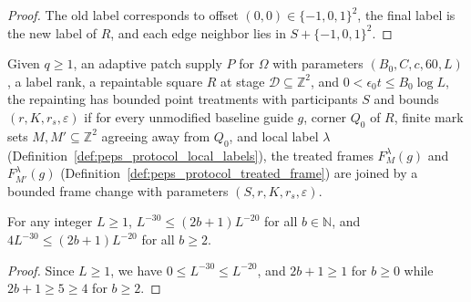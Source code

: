 \begin{proof}\leanok
    The old label corresponds to offset $(0,0)\in\{-1,0,1\}^2$, the final label is the new label of $R$, and each edge neighbor lies in $S+\{-1,0,1\}^2$.
\end{proof}

\begin{definition}
    \label{def:peps_protocol_local_point_treatments}
    \leanok
    Given $q\ge1$, an adaptive patch supply $P$ for $\Omega$ with parameters $(B_0,C,c,60,L)$, a label rank, a repaintable square $R$ at stage $\mathcal D\subseteq\mathbb Z^2$, and $0<\epsilon_0t\le B_0\log L$, the repainting has bounded point treatments with participants $S$ and bounds $(r,K,r_s,\varepsilon)$ if for every unmodified baseline guide $g$, corner $Q_0$ of $R$, finite mark sets $M,M'\subseteq\mathbb Z^2$ agreeing away from $Q_0$, and local label $\lambda$ (Definition~\ref{def:peps_protocol_local_labels}), the treated frames $F_M^\lambda(g)$ and $F_{M'}^\lambda(g)$ (Definition~\ref{def:peps_protocol_treated_frame}) are joined by a bounded frame change with parameters $(S,r,K,r_s,\varepsilon)$.
\end{definition}

\begin{lemma}
    \label{thm:peps_protocol_small_patch_error_bounds}
    \leanok
    For any integer $L\ge1$, $L^{-30}\le(2b+1)L^{-20}$ for all $b\in\mathbb N$, and $4L^{-30}\le(2b+1)L^{-20}$ for all $b\ge2$.
\end{lemma}

\begin{proof}\leanok
    Since $L\ge1$, we have $0\le L^{-30}\le L^{-20}$, and $2b+1\ge1$ for $b\ge0$ while $2b+1\ge5\ge4$ for $b\ge2$.
\end{proof}

